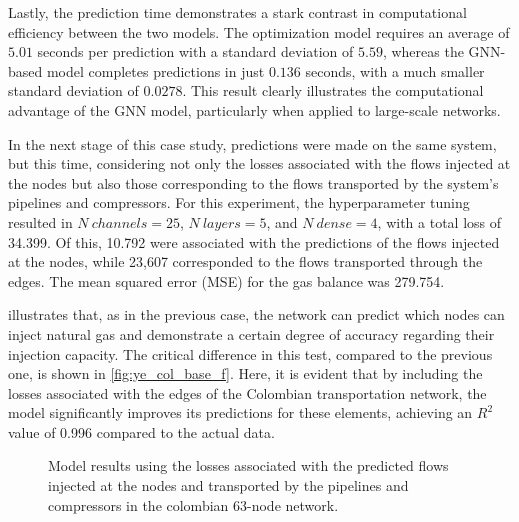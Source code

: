 Lastly, the prediction time demonstrates a stark contrast in computational efficiency between the two models. The optimization model requires an average of $5.01$ seconds per prediction with a standard deviation of $5.59$, whereas the GNN-based model completes predictions in just $0.136$ seconds, with a much smaller standard deviation of $0.0278$. This result clearly illustrates the computational advantage of the GNN model, particularly when applied to large-scale networks.







In the next stage of this case study, predictions were made on the same system, but this time, considering not only the losses associated with the flows injected at the nodes but also those corresponding to the flows transported by the system's pipelines and compressors. For this experiment, the hyperparameter tuning resulted in $N \ channels = 25$, $N \ layers = 5$, and $N \ dense = 4$, with a total loss of 34.399. Of this, 10.792 were associated with the predictions of the flows injected at the nodes, while 23,607 corresponded to the flows transported through the edges. The mean squared error (MSE) for the gas balance was 279.754.

 illustrates that, as in the previous case, the network can predict which nodes can inject natural gas and demonstrate a certain degree of accuracy regarding their injection capacity. The critical difference in this test, compared to the previous one, is shown in \cref{fig:ye_col_base_f}. Here, it is evident that by including the losses associated with the edges of the Colombian transportation network, the model significantly improves its predictions for these elements, achieving an $R^2$ value of 0.996 compared to the actual data.


\begin{figure}
    \centering
        \setlength{}        
        \setlength{} 
        \caption{Model results using the losses associated with the predicted flows injected at the nodes and transported by the pipelines and compressors in the colombian 63-node network.}
        \label{fig:col_base_f_results}
\end{figure}


